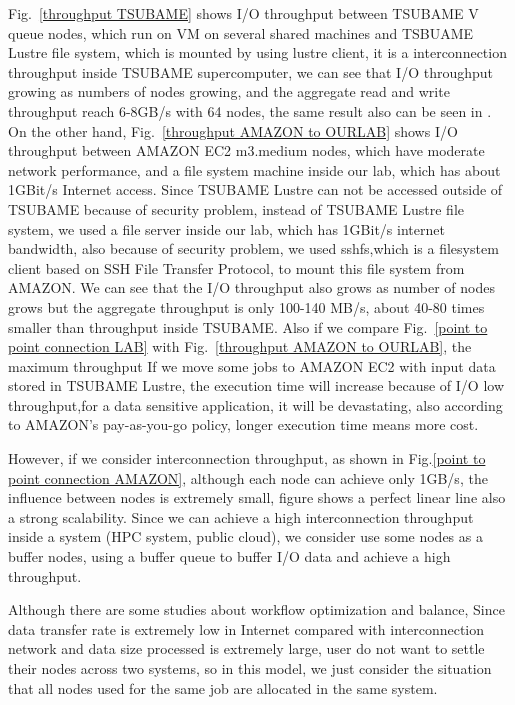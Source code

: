 Fig.~\ref{throughput TSUBAME} shows I/O throughput between TSUBAME V queue nodes, which run on VM on several shared machines and TSBUAME Lustre file system, which is mounted by using lustre client, it is a interconnection throughput inside TSUBAME supercomputer, we can see that I/O throughput growing as numbers of nodes growing, and the aggregate read and write throughput reach 6-8GB/s with 64 nodes, the same result also can be seen in \cite{checkpointing}.
On the other hand, Fig.~\ref{throughput AMAZON to OURLAB} shows I/O throughput between AMAZON EC2 m3.medium nodes, which have moderate network performance, and a file system machine inside our lab, which has about 1GBit/s Internet access.
Since TSUBAME Lustre can not be accessed outside of TSUBAME because of security problem, instead of TSUBAME Lustre file system, we used a file server inside our lab, which has 1GBit/s internet bandwidth, also because of security problem, we used sshfs\cite{sshfs},which is a filesystem client based on SSH File Transfer Protocol, to mount this file system from AMAZON.
We can see that the I/O throughput also grows as number of nodes grows but the aggregate throughput is only 100-140 MB/s, about 40-80 times smaller than throughput inside TSUBAME.
Also if we compare Fig.~\ref{point to point connection LAB} with Fig.~\ref{throughput AMAZON to OURLAB}, the maximum throughput 
If we move some jobs to AMAZON EC2 with input data stored in TSUBAME Lustre, the execution time will increase because of I/O low throughput,for a data sensitive application, it will be devastating, also according to AMAZON's pay-as-you-go policy\cite{AMAZON_AWS}, longer execution time means more cost.

However, if we consider interconnection throughput, as shown in Fig.\ref{point to point connection AMAZON}, although each node can achieve only 1GB/s, the influence between nodes is extremely small, figure shows a perfect linear line also a strong scalability.
Since we can achieve a high interconnection throughput inside a system (HPC system, public cloud), we consider use some nodes as a buffer nodes, using a buffer queue to buffer I/O data and achieve a high throughput.

Although there are some studies about workflow optimization and  balance\cite{Workload}, Since data transfer rate is extremely low in Internet compared with interconnection network and data size processed is extremely large, user do not want to settle their nodes across two systems, so in this model, we just consider the situation that all nodes used for the same job are allocated in the same system.